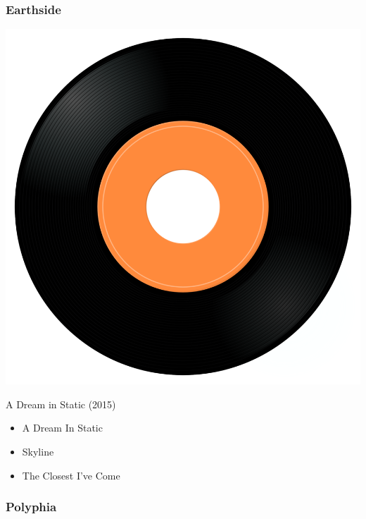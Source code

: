 \subsubsection{Earthside}

\begin{minipage}[t]{0.25\textwidth}
\captionsetup{type=figure}
\includegraphics[width=\textwidth]{Images/cover.png}
\caption*{A Dream in Static (2015)}
\end{minipage}
\begin{minipage}[t]{0.25\textwidth}\vspace{0pt}
\begin{itemize}[nosep,leftmargin=1em,labelwidth=*,align=left]
	\setlength{\itemsep}{0pt}
	\item A Dream In Static
	\item Skyline
	\item The Closest I've Come
\end{itemize}
\end{minipage}

\subsubsection{Polyphia}


